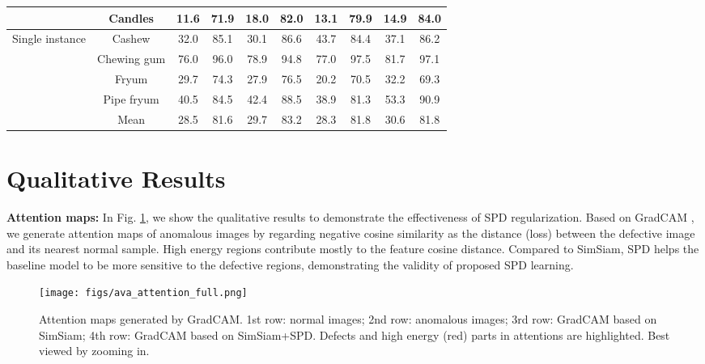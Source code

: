 \documentclass[runningheads]{llncs}
\begin{document}
\begin{table*}[!ht]
{\begin{tabular}{cc|cccc|cccc}
    \multicolumn{1}{c|}{}                                    & Candles     & 11.6  & 71.9                        & 18.0        & 82.0        & 13.1  & 79.9                        & 14.9       & 84.0        \\ \hline
    \multicolumn{1}{c|}{\multirow{4}{*}{Single instance}}    & Cashew      & 32.0  & 85.1                        & 30.1        & 86.6        & 43.7  & 84.4                        & 37.1       & 86.2        \\
    \multicolumn{1}{c|}{}                                    & Chewing gum & 76.0  & 96.0                        & 78.9        & 94.8        & 77.0  & 97.5                        & 81.7       & 97.1        \\
    \multicolumn{1}{c|}{}                                    & Fryum       & 29.7  & 74.3                        & 27.9        & 76.5        & 20.2  & 70.5                        & 32.2       & 69.3        \\
    \multicolumn{1}{c|}{}                                    & Pipe fryum  & 40.5  & 84.5                        & 42.4        & 88.5        & 38.9  & 81.3                        & 53.3       & 90.9        \\ \hline
    \multicolumn{1}{c|}{}                                    & Mean        & 28.5  & 81.6                        & 29.7        & 83.2        & 28.3  & 81.8                        & 30.6       & 81.8        \\ \hline
    \end{tabular}}
\end{table*}


\section{Qualitative Results}

\noindent\textbf{Attention maps: }
In Fig. \ref{fig:diff_attention}, we show the qualitative results to demonstrate the effectiveness of SPD regularization. Based on GradCAM \cite{selvaraju2017grad}, we generate attention maps of anomalous images by regarding negative cosine similarity as the distance (loss) between the defective image and its nearest normal sample. High energy regions contribute mostly to the feature cosine distance. Compared to SimSiam, SPD helps the baseline model to be more sensitive to the defective regions, demonstrating the validity of proposed SPD learning.
\begin{figure}[!t]
\centering
\texttt{[image: figs/ava\_attention\_full.png]}
 \caption{Attention maps generated by GradCAM. 1st row: normal images; 2nd row: anomalous images; 3rd row: GradCAM based on SimSiam; 4th row: GradCAM based on SimSiam+SPD. Defects and high energy (red) parts in attentions are highlighted. Best viewed by zooming in.}
 \label{fig:diff_attention}
\end{figure}
\end{document}
